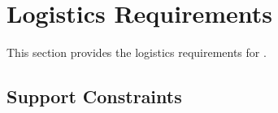 \KNEADSECTIONNEWPAGE
\section{Logistics Requirements}
\label{lab:sec_Logistics}
% 
This section provides the logistics requirements for \ThisSys.

\KNEADSUBSECTIONNEWPAGE
\subsection{Support Constraints}
\label{lab:ssec_Logistics_SuportConstraints_CAP}






% 


